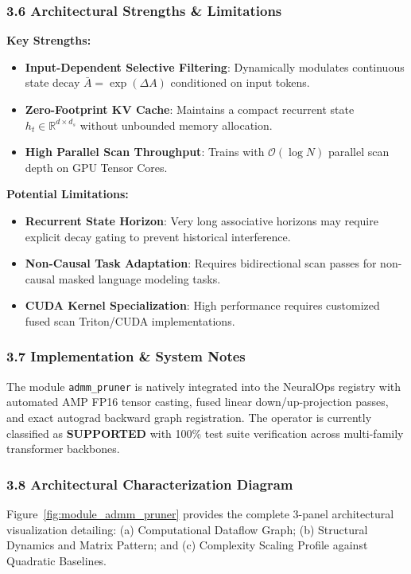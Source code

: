 \subsubsection*{3.6 Architectural Strengths \& Limitations}
\textbf{Key Strengths:}
\begin{itemize}
    \item \textbf{Input-Dependent Selective Filtering}: Dynamically modulates continuous state decay $\bar{A} = \exp(\Delta A)$ conditioned on input tokens.
    \item \textbf{Zero-Footprint KV Cache}: Maintains a compact recurrent state $h_t \in \mathbb{R}^{d \times d_s}$ without unbounded memory allocation.
    \item \textbf{High Parallel Scan Throughput}: Trains with $\mathcal{O}(\log N)$ parallel scan depth on GPU Tensor Cores.
\end{itemize}

\textbf{Potential Limitations:}
\begin{itemize}
    \item \textbf{Recurrent State Horizon}: Very long associative horizons may require explicit decay gating to prevent historical interference.
    \item \textbf{Non-Causal Task Adaptation}: Requires bidirectional scan passes for non-causal masked language modeling tasks.
    \item \textbf{CUDA Kernel Specialization}: High performance requires customized fused scan Triton/CUDA implementations.
\end{itemize}

\subsubsection*{3.7 Implementation \& System Notes}
The module \texttt{admm\_pruner} is natively integrated into the NeuralOps registry with automated AMP FP16 tensor casting, fused linear down/up-projection passes, and exact autograd backward graph registration. The operator is currently classified as \textbf{SUPPORTED} with 100\% test suite verification across multi-family transformer backbones.

\subsubsection*{3.8 Architectural Characterization Diagram}
Figure~\ref{fig:module_admm_pruner} provides the complete 3-panel architectural visualization detailing: (a) Computational Dataflow Graph; (b) Structural Dynamics and Matrix Pattern; and (c) Complexity Scaling Profile against Quadratic Baselines.


